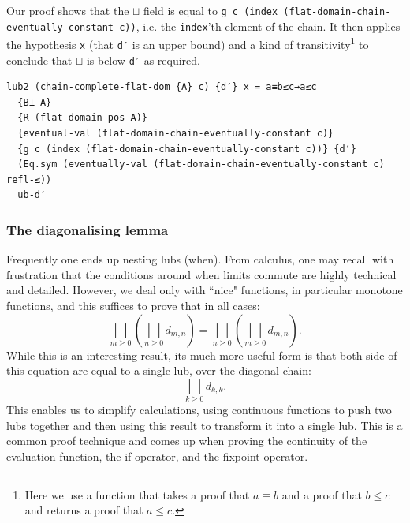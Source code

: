 \documentclass[12pt,a4paper,twoside,openright]{report}
\begin{document}
\begin{itemize}
Our proof shows that the $\sqcup$ field is equal to \texttt{g c (index (flat-domain-chain-eventually-constant c))}, i.e. the \texttt{index}'th element of the chain. It then applies the hypothesis \texttt{x} (that \texttt{d′} is an upper bound) and a kind of transitivity\footnote{Here we use a function that takes a proof that $a \equiv b$ and a proof that $b \leq c$ and returns a proof that $a \leq c$.} to conclude that $\sqcup$ is below \texttt{d′} as required. 
\begin{verbatim}
lub2 (chain-complete-flat-dom {A} c) {d′} x = a≡b≤c→a≤c
  {B⊥ A}
  {R (flat-domain-pos A)}
  {eventual-val (flat-domain-chain-eventually-constant c)}
  {g c (index (flat-domain-chain-eventually-constant c))} {d′}
  (Eq.sym (eventually-val (flat-domain-chain-eventually-constant c) refl-≤))
  ub-d′
\end{verbatim}
\end{itemize}
\subsubsection{The diagonalising lemma}
Frequently one ends up nesting lubs (when). From calculus, one may recall with frustration that the conditions around when limits commute are highly technical and detailed. However, we deal only with ``nice" functions, in particular monotone functions, and this suffices to prove that in all cases:
\begin{equation} \label{comm-double-lub}
\bigsqcup_{m \geq 0} \left( \bigsqcup_{n \geq 0} d_{m, n}\right) = 	\bigsqcup_{n \geq 0} \left( \bigsqcup_{m \geq 0} d_{m, n}\right).
\end{equation}
While this is an interesting result, its much more useful form is that both side of this equation are equal to a single lub, over the diagonal chain:
\begin{equation} \label{diag}
\bigsqcup_{k \geq 0} d_{k, k}.
\end{equation}
This enables us to simplify calculations, using continuous functions to push two lubs together and then using this result to transform it into a single lub. This is a common proof technique and comes up when proving the continuity of the evaluation function, the if-operator, and the fixpoint operator. 
\end{document}
